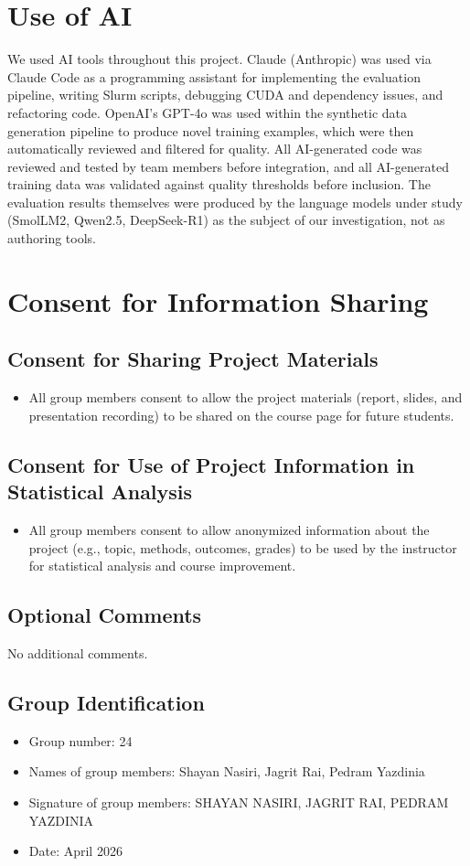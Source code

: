 \documentclass{article}
\begin{document}
\newpage
\section*{Use of AI}

We used AI tools throughout this project. Claude (Anthropic) was used via Claude Code as a programming assistant for implementing the evaluation pipeline, writing Slurm scripts, debugging CUDA and dependency issues, and refactoring code. OpenAI's GPT-4o was used within the synthetic data generation pipeline to produce novel training examples, which were then automatically reviewed and filtered for quality. All AI-generated code was reviewed and tested by team members before integration, and all AI-generated training data was validated against quality thresholds before inclusion. The evaluation results themselves were produced by the language models under study (SmolLM2, Qwen2.5, DeepSeek-R1) as the subject of our investigation, not as authoring tools.

\section*{Consent for Information Sharing}

\subsection*{Consent for Sharing Project Materials}

\begin{itemize}
	\item All group members consent to allow the project materials (report, slides, and presentation recording) to be shared on the course page for future students.
\end{itemize}

\subsection*{Consent for Use of Project Information in Statistical Analysis}

\begin{itemize}
	\item All group members consent to allow anonymized information about the project (e.g., topic, methods, outcomes, grades) to be used by the instructor for statistical analysis and course improvement.
\end{itemize}

\subsection*{Optional Comments}

No additional comments.

\subsection*{Group Identification}

\begin{itemize}
	\item Group number: 24
	\item Names of group members: Shayan Nasiri, Jagrit Rai, Pedram Yazdinia
	\item Signature of group members: SHAYAN NASIRI, JAGRIT RAI, PEDRAM YAZDINIA
	\item Date: April 2026
\end{itemize}
\end{document}
